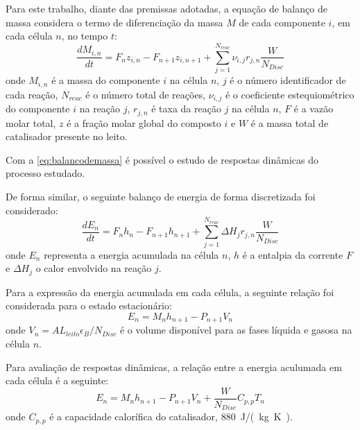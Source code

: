 Para este trabalho, diante das premissas adotadas, a equação de balanço de massa
considera o termo de diferenciação da massa $M$ de cada componente $i$, em cada
célula $n$, no tempo $t$: 
\begin{equation}
\dfrac{dM_{i,n}}{dt} = F_n z_{i,n} - F_{n+1} z_{i,n+1} +
\displaystyle\sum_{j=1}^{N_{reac}} \nu_{i,j}r_{j,n} \dfrac{W}{N_{Disc}}
\label{eq:balancodemassa}
\end{equation}
onde $M_{i,n}$ é a massa do componente $i$ na célula $n$, $j$ é o número
identificador de cada reação, $N_{reac}$ é o número total de reações,
$\nu_{i,j}$ é o coeficiente estequiométrico do componente $i$ na reação $j$,
$r_{j,n}$ é taxa da reação $j$ na célula $n$, $F$ é a vazão molar total,
$z$ é a fração molar global do composto $i$ e $W$ é a massa total de
catalisador presente no leito.

Com a \autoref{eq:balancodemassa} é possível o estudo de respostas dinâmicas do
processo estudado.


De forma similar, o seguinte balanço de energia de forma
discretizada foi considerado:
\begin{equation}
\dfrac{dE_{n}}{dt} = F_nh_{n} - F_{n+1}h_{n+1} +
\displaystyle\sum_{j=1}^{N_{reac}} \Delta H_{j}r_{j,n} \dfrac{W}{N_{Disc}}
\label{eq:balancodeenergia}
\end{equation}
onde $E_{n}$ representa a energia acumulada na célula $n$, $h$ é a entalpia da
corrente $F$ e $\Delta H_{j}$ o calor envolvido na reação $j$.

Para a expressão da energia acumulada em cada célula, a seguinte relação
foi considerada para o estado estacionário:
\begin{equation}
E_{n} = M_{n}h_{n+1} - P_{n+1}V_{n}
\label{eq:holdupenergia}
\end{equation}
onde $V_{n} = AL_{leito}\epsilon_{B}/N_{Disc}$ é o volume disponível para as
fases líquida e gasosa na célula $n$.

Para avaliação de respostas dinâmicas, a relação entre a energia aculumada em
cada célula é a seguinte:
\begin{equation}
E_{n} = M_{n}h_{n+1} - P_{n+1}V_{n} + 
\dfrac{W}{N_{Disc}}C_{p,p}T_{n}
\label{eq:holdupenergiadinamica}
\end{equation}
onde $C_{p,p}$ é a capacidade calorífica do catalisador, \SI{880}{J/(kg K)}.

